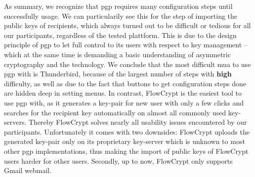 As summary, we recognize that \acrshort{pgp} requires many configuration steps until successfully usage. We can particularily see this for the step of importing the public keys of recipients, which always turned out to be difficult or tedious for all our participants, regardless of the tested plattform. This is due to the design principle of \acrshort{pgp} to let full control to its users with respect to key management -- which at the same time is demanding a basic understanding of asymmetric cryptography and the technology. We conclude that the most difficult \acrshort{mua} to use \acrshort{pgp} with is Thunderbird, because of the largest number of steps with \textbf{high} difficulty, as well as due to the fact that buttons to get configuration steps done are hidden deep in setting menus. In contrast, FlowCrypt is the easiest tool to use \acrshort{pgp} with, as it generates a key-pair for new user with only a few clicks and searches for the recipient key automatically on almost all commonly used key-servers. Thereby FlowCrypt solves nearly all usability issues encountered by our participants. Unfortunately it comes with two downsides: FlowCrypt uploads the generated key-pair only on its proprietary key-server which is unknown to most other \acrshort{pgp} implementations, thus making the import of public keys of FlowCrypt users harder for other users. Secondly, up to now, FlowCrypt only supports Gmail webmail.

